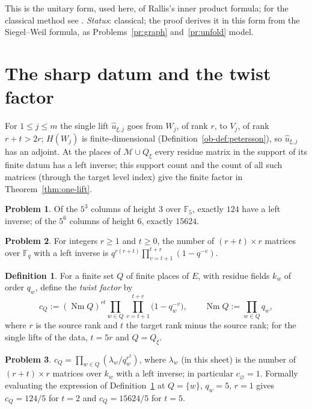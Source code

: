 \documentclass[reqno]{amsart}
\theoremstyle{definition}
\newtheorem{problem}{Problem}[section]
\newtheorem{definition}{Definition}[section]
\theoremstyle{plain}
\newcommand{\F}{\mathbb{F}}
\newcommand{\Mch}{\mathcal{M}}
\newcommand{\Nm}{\operatorname{Nm}}
\newcommand{\uh}{\hat u}
\begin{document}
This is the unitary form, used here, of Rallis's inner product formula; for the classical method see \cite[\S\S\,2--3]{Ra87}.  \emph{Status}: classical; the proof derives it in this form from the Siegel--Weil formula, as Problems~\ref{pr:graph} and~\ref{pr:unfold} model.

\section{The sharp datum and the twist factor}\label{sec:sharp}

For \(1 \le j \le m\) the single lift \(\uh_{\xi,j}\) goes from \(W_j\), of rank \(r\), to \(V_j\), of rank \(r + t > 2r\); \(H(W_j)\) is finite-dimensional (Definition~\ref{ob-def:petersson}), so \(\uh_{\xi,j}\) has an adjoint.  At the places of \(\Mch \cup Q_\xi\) every residue matrix in the support of its finite datum has a left inverse; this support count and the count of all such matrices (through the target level index) give the finite factor in Theorem~\ref{thm:one-lift}.

\begin{problem}\label{pr:columns}
Of the \(5^3\) columns of height \(3\) over \(\F_5\), exactly \(124\) have a left inverse; of the \(5^6\) columns of height \(6\), exactly \(15624\).
\end{problem}

\begin{problem}\label{pr:left-inverse}
For integers \(r \ge 1\) and \(t \ge 0\), the number of \((r + t) \times r\) matrices over \(\F_q\) with a left inverse is \(q^{r(r+t)} \prod_{v = t+1}^{t+r} (1 - q^{-v})\).
\end{problem}

\begin{definition}\label{def:twist-factor}
For a finite set \(Q\) of finite places of \(E\), with residue fields \(k_w\) of order \(q_w\), define the \emph{twist factor} by
\[
  c_Q := (\Nm Q)^{rt} \prod_{w \in Q} \prod_{v = t+1}^{t+r} \bigl(1 - q_w^{-v}\bigr), \qquad \Nm Q := \prod_{w \in Q} q_w ,
\]
where \(r\) is the source rank and \(t\) the target rank minus the source rank; for the single lifts of the data, \(t = 5r\) and \(Q = Q_\xi\).
\end{definition}

\begin{problem}\label{pr:cQ}
\(c_Q = \prod_{w \in Q} (\lambda_w / q_w^{r^2})\), where \(\lambda_w\) (in this sheet) is the number of \((r+t) \times r\) matrices over \(k_w\) with a left inverse; in particular \(c_\varnothing = 1\).  Formally evaluating the expression of Definition~\ref{def:twist-factor} at \(Q = \{w\}\), \(q_w = 5\), \(r = 1\) gives \(c_Q = 124/5\) for \(t = 2\) and \(c_Q = 15624/5\) for \(t = 5\).
\end{problem}
\end{document}
